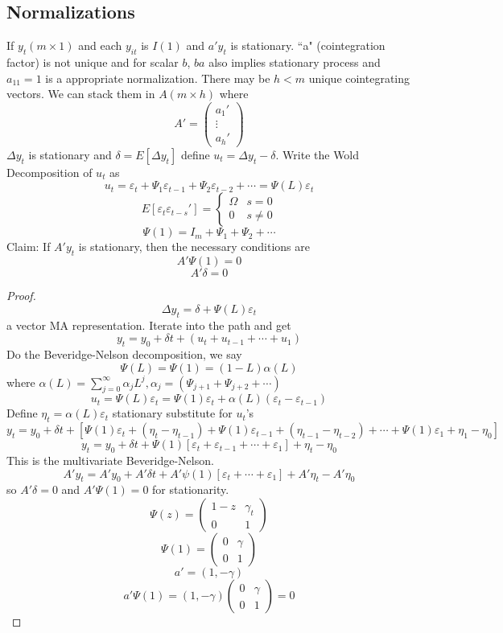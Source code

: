 \documentclass[11pt, a4paper, oneside]{article}
\theoremstyle{definition}
\theoremstyle{proposition}
\theoremstyle{corollary}
\theoremstyle{lemma}
\theoremstyle{theorem}
\begin{document}
\subsection{Normalizations}
If $y_t (m\times 1)$ and each $y_{it}$ is $I(1)$ and $a'y_t$ is stationary. ``a" (cointegration factor) is not unique and for scalar $b$, $ba$ also implies stationary process and $a_{11} = 1$ is a appropriate normalization. There may be  $h  < m$ unique cointegrating vectors. We can stack them in $A (m \times h)$ where
$$A' = \begin{pmatrix} a_1' \\ \vdots \\ a_h' \end{pmatrix}$$ 
$\Delta y_t$ is stationary and $\delta = E[\Delta y_t]$ define $u_t = \Delta y_t - \delta$. Write the Wold Decomposition of $u_t$ as 
$$u_t = \varepsilon_t + \Psi_1\varepsilon_{t-1} + \Psi_2 \varepsilon_{t-2} + \cdots = \Psi(L) \varepsilon_t$$
$$E[\varepsilon_t\varepsilon_{t-s}'] = \begin{cases} \Omega & s = 0 \\ 0 & s \neq 0\end{cases}$$ 
$$\Psi(1) = I_m + \Psi_1+ \Psi_2+\cdots$$
Claim: If $A'y_t$ is stationary, then the necessary conditions are 
$$A' \Psi(1) = 0$$
$$A' \delta = 0$$
\begin{proof}
$$\Delta y_t = \delta+ \Psi(L)\varepsilon_t$$ a vector MA representation. Iterate into the path and get 
$$y_t = y_0 + \delta t + (u_t + u_{t-1} + \cdots + u_1)$$
Do the Beveridge-Nelson decomposition, we say
$$\Psi(L) = \Psi(1) = (1- L) \alpha(L)$$ where $\alpha(L) = \sum_{j =0}^{\infty} \alpha_j L^j, \alpha_j = (\Psi_{j+1}+ \Psi_{j+2}+ \cdots)$ 
$$u_t = \Psi(L) \varepsilon_t = \Psi(1) \varepsilon_t + \alpha(L)(\varepsilon_t - \varepsilon_{t-1})$$
Define $\eta_t = \alpha(L) \varepsilon_t$ stationary substitute for $u_t$'s
$$y_t = y_0 +\delta t + \left[\Psi(1) \varepsilon_t + (\eta_t - \eta_{t-1}) + \Psi(1)\varepsilon_{t-1} + (\eta_{t-1}  - \eta_{t-2}) + \cdots + \Psi(1)\varepsilon_1 + \eta_1 - \eta_0\right]$$
$$y_t = y_0 + \delta t + \Psi(1)[\varepsilon_t + \varepsilon_{t-1} + \cdots + \varepsilon_1] + \eta_t - \eta_0$$
This is the multivariate Beveridge-Nelson. $$A'y_t = A'y_0 + A'\delta t + A' \psi(1)[\varepsilon_t + \cdots + \varepsilon_1] + A'\eta_t - A'\eta_0$$
so $A'\delta = 0$ and $A'\Psi(1) = 0$ for stationarity. 
$$\Psi(z) = \begin{pmatrix} 1 - z & \gamma_t \\ 0 & 1\end{pmatrix}$$
$$\Psi(1) = \begin{pmatrix} 0 & \gamma \\ 0 & 1\end{pmatrix}$$
$$a' = (1, -\gamma)$$
$$a'\Psi(1) = (1, -\gamma) \begin{pmatrix} 0 & \gamma \\ 0 & 1\end{pmatrix} = 0$$
\end{proof}
\end{document}
